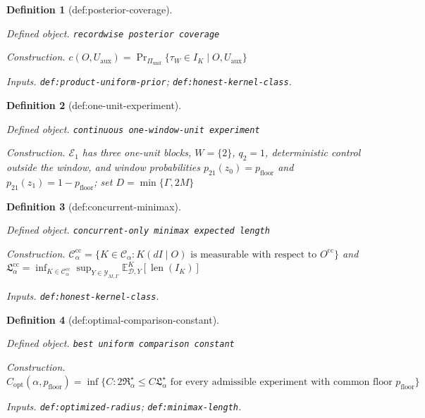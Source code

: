 \documentclass{article}
\newtheorem{definition}{Definition}
\begin{document}
\begin{definition}[def:posterior-coverage]\label{def:posterior-coverage}
\par\smallskip\noindent\emph{Defined object.} \texttt{recordwise posterior coverage}
\par\smallskip\noindent\emph{Construction.} \(c(O,U_{\mathrm{aux}})=\Pr_{\Pi_{\mathrm{unif}}}\{\tau_W\in I_K\mid O,U_{\mathrm{aux}}\}\)
\par\smallskip\noindent\emph{Inputs.} \texttt{def:\allowbreak{}product-\allowbreak{}uniform-\allowbreak{}prior}; \texttt{def:\allowbreak{}honest-\allowbreak{}kernel-\allowbreak{}class}.
\end{definition}

\begin{definition}[def:one-unit-experiment]\label{def:one-unit-experiment}
\par\smallskip\noindent\emph{Defined object.} \texttt{continuous one-\allowbreak{}window-\allowbreak{}unit experiment}
\par\smallskip\noindent\emph{Construction.} \(\mathcal E_1\) has three one-unit blocks, \(W=\{2\}\), \(q_2=1\), deterministic control outside the window, and window probabilities \(p_{21}(z_0)=p_{\mathrm{floor}}\) and \(p_{21}(z_1)=1-p_{\mathrm{floor}}\); set \(D=\min\{\Gamma,2M\}\)
\end{definition}

\begin{definition}[def:concurrent-minimax]\label{def:concurrent-minimax}
\par\smallskip\noindent\emph{Defined object.} \texttt{concurrent-\allowbreak{}only minimax expected length}
\par\smallskip\noindent\emph{Construction.} \(\mathcal C_\alpha^{\mathrm{cc}}=\{K\in\mathcal C_\alpha:K(dI\mid O)\text{ is measurable with respect to }O^{\mathrm{cc}}\}\) and \(\mathfrak L_\alpha^{\mathrm{cc}}=\inf_{K\in\mathcal C_\alpha^{\mathrm{cc}}}\sup_{Y\in\mathcal Y_{M,\Gamma}}\mathbb E^K_{\mathcal D,Y}[\operatorname{len}(I_K)]\)
\par\smallskip\noindent\emph{Inputs.} \texttt{def:\allowbreak{}honest-\allowbreak{}kernel-\allowbreak{}class}.
\end{definition}

\begin{definition}[def:optimal-comparison-constant]\label{def:optimal-comparison-constant}
\par\smallskip\noindent\emph{Defined object.} \texttt{best uniform comparison constant}
\par\smallskip\noindent\emph{Construction.} \(C_{\mathrm{opt}}(\alpha,p_{\mathrm{floor}})=\inf\{C:2\mathfrak R_\alpha^\star\le C\mathfrak L_\alpha^\star\text{ for every admissible experiment with common floor }p_{\mathrm{floor}}\}\)
\par\smallskip\noindent\emph{Inputs.} \texttt{def:\allowbreak{}optimized-\allowbreak{}radius}; \texttt{def:\allowbreak{}minimax-\allowbreak{}length}.
\end{definition}
\end{document}
